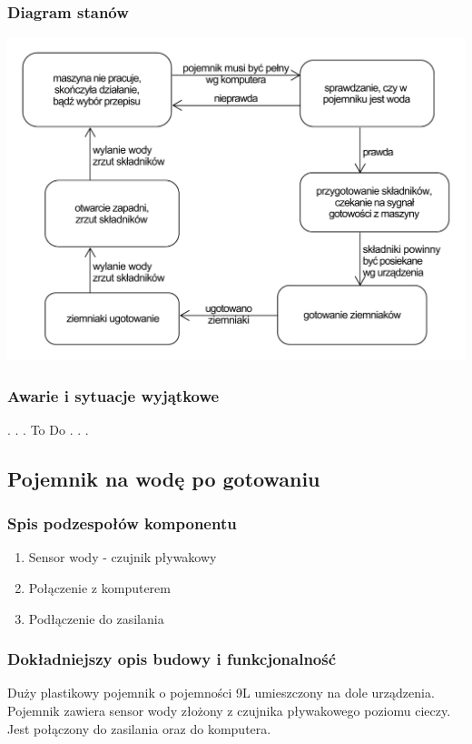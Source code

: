 \documentclass[12pt,a4paper,notitlepage]{report}
\begin{document}
\subsubsection{Diagram stanów}
\includegraphics[width=\textwidth,height=\textheight,keepaspectratio=true]{Diagram-stanow-pojemnik-na-ziemniaki.pdf}

\subsubsection{Awarie i sytuacje wyjątkowe}
. . . To Do . . .



\subsection{Pojemnik na wodę po gotowaniu}
\subsubsection{Spis podzespołów komponentu}
\begin{enumerate}
  \item Sensor wody - czujnik pływakowy
  \item Połączenie z komputerem
  \item Podłączenie do zasilania
\end{enumerate}

\subsubsection{Dokładniejszy opis budowy i funkcjonalność}
Duży plastikowy pojemnik o pojemności 9L umieszczony na dole urządzenia. Pojemnik zawiera sensor wody złożony z czujnika pływakowego poziomu cieczy. Jest połączony do zasilania oraz do komputera.
 
\end{document}
